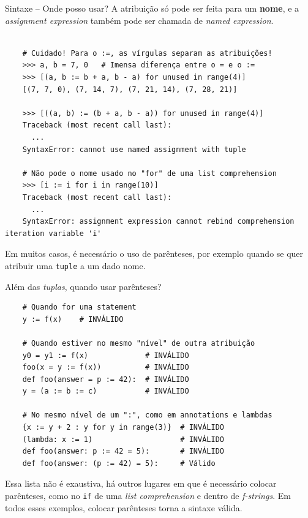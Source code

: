 \documentclass[utf8]{beamer}
\begin{document}
\begin{frame}[fragile]{Sintaxe -- Onde posso usar?}
  A atribuição só pode ser feita para um \textbf{nome},
  e a \emph{assignment expression}
  também pode ser chamada de \emph{named expression}.
  \vspace{-.5em}
  \begin{verbatim}

    # Cuidado! Para o :=, as vírgulas separam as atribuições!
    >>> a, b = 7, 0   # Imensa diferença entre o = e o :=
    >>> [(a, b := b + a, b - a) for unused in range(4)]
    [(7, 7, 0), (7, 14, 7), (7, 21, 14), (7, 28, 21)]

    >>> [((a, b) := (b + a, b - a)) for unused in range(4)]
    Traceback (most recent call last):
      ...
    SyntaxError: cannot use named assignment with tuple

    # Não pode o nome usado no "for" de uma list comprehension
    >>> [i := i for i in range(10)]
    Traceback (most recent call last):
      ...
    SyntaxError: assignment expression cannot rebind comprehension iteration variable 'i'

  \end{verbatim}
  \vfill
  \vspace{-.5em}
  Em muitos casos, é necessário o uso de parênteses,
  por exemplo quando se quer atribuir uma \texttt{tuple}
  a um dado nome.
\end{frame}


\begin{frame}[fragile]{Além das \emph{tuplas}, quando usar parênteses?}
  \vspace{-1em}
  \begin{verbatim}
    # Quando for uma statement
    y := f(x)    # INVÁLIDO

    # Quando estiver no mesmo "nível" de outra atribuição
    y0 = y1 := f(x)             # INVÁLIDO
    foo(x = y := f(x))          # INVÁLIDO
    def foo(answer = p := 42):  # INVÁLIDO
    y = (a := b := c)           # INVÁLIDO

    # No mesmo nível de um ":", como em annotations e lambdas
    {x := y + 2 : y for y in range(3)}  # INVÁLIDO
    (lambda: x := 1)                    # INVÁLIDO
    def foo(answer: p := 42 = 5):       # INVÁLIDO
    def foo(answer: (p := 42) = 5):     # Válido
  \end{verbatim}
  \vfill
  Essa lista não é exaustiva,
  há outros lugares em que é necessário colocar parênteses,
  como no \texttt{if} de uma \emph{list comprehension}
  e dentro de \emph{f-strings}.
  Em todos esses exemplos, colocar parênteses torna a sintaxe válida.
\end{frame}
\end{document}

